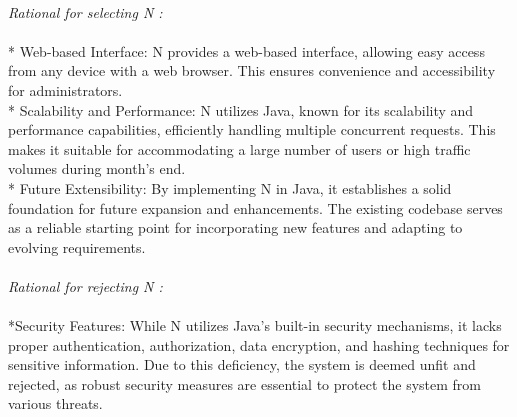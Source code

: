 \documentclass[letterpaper, 11pt]{report}
\begin{document}
\\
\normalsize{\textit{Rational for selecting N :}}
\\
\normalsize{
\\
* Web-based Interface: N provides a web-based interface, allowing easy access from any device with a web browser. This ensures convenience and accessibility for administrators.
\\
* Scalability and Performance: N utilizes Java, known for its scalability and performance capabilities, efficiently handling multiple concurrent requests. This makes it suitable for accommodating a large number of users or high traffic volumes during month's end.
\\
* Future Extensibility: By implementing N in Java, it establishes a solid foundation for future expansion and enhancements. The existing codebase serves as a reliable starting point for incorporating new features and adapting to evolving requirements.\\
}\\
\normalsize{\textit{ Rational for rejecting N :}}
\\
\\
\normalsize{
*Security Features: While N utilizes Java's built-in security mechanisms, it lacks proper authentication, authorization, data encryption, and hashing techniques for sensitive information. Due to this deficiency, the system is deemed unfit and rejected, as robust security measures are essential to protect the system from various threats.}
\\
\end{document}
